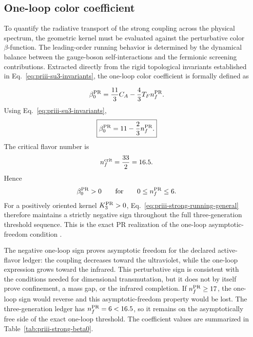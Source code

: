 \documentclass[11pt]{article}
\begin{document}
\subsection{One-loop color coefficient}
\label{subsec:priii-strong-one-loop-coefficient}
To quantify the radiative transport of the strong coupling across the physical spectrum, the geometric kernel must be evaluated against the perturbative color $\beta$-function. The leading-order running behavior is determined by the dynamical balance between the gauge-boson self-interactions and the fermionic screening contributions. Extracted directly from the rigid topological invariants established in Eq.~\eqref{eq:priii-su3-invariants}, the one-loop color coefficient is formally defined as

\begin{equation}
\beta_0^{\rm PR}
=
\frac{11}{3}C_A
-
\frac{4}{3}T_F n_f^{\rm PR}.
\end{equation}
Using Eq.~\eqref{eq:priii-su3-invariants},
\begin{equation}
\boxed{
\beta_0^{\rm PR}
=
11-\frac23 n_f^{\rm PR}.
}
\label{eq:priii-beta0-reduced}
\end{equation}
The critical flavor number is
\begin{equation}
n_f^{\rm crit}
=
\frac{33}{2}
=
16.5.
\end{equation}
Hence
\begin{equation}
\beta_0^{\rm PR}>0
\qquad
\text{for}
\qquad
0\leq n_f^{\rm PR}\leq 6.
\end{equation}
For a positively oriented kernel \(K_3^{\rm PR}>0\), Eq.~\eqref{eq:priii-strong-running-general} therefore maintains a strictly negative sign throughout the full three-generation threshold sequence. This is the exact PR realization of the one-loop asymptotic-freedom condition \cite{GrossWilczek1973, Politzer1973}.

The negative one-loop sign proves asymptotic freedom for the declared active-flavor ledger: the coupling decreases toward the ultraviolet, while the one-loop expression grows toward the infrared.  This perturbative sign is consistent with the conditions needed for dimensional transmutation, but it does not by itself prove confinement, a mass gap, or the infrared completion.  If \(n_f^{\rm PR}\geq17\), the one-loop sign would reverse and this asymptotic-freedom property would be lost.  The three-generation ledger has \(n_f^{\rm PR}=6<16.5\), so it remains on the asymptotically free side of the exact one-loop threshold.  The coefficient values are summarized in Table~\ref{tab:priii-strong-beta0}.
\end{document}
